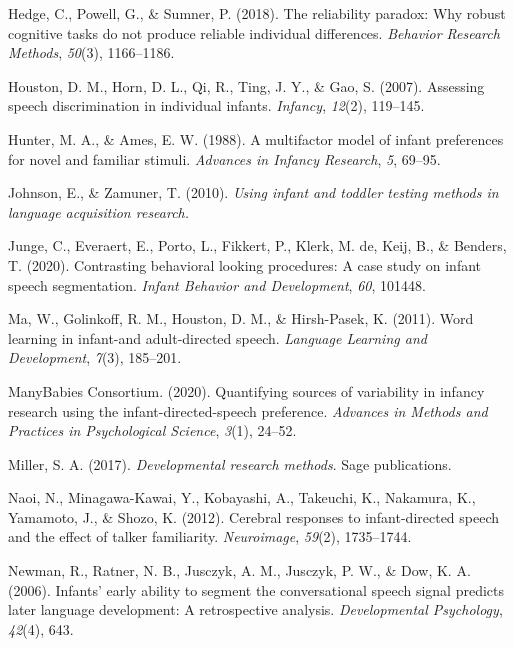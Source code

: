 \documentclass[
  man,floatsintext]{apa6}
\newlength{\cslhangindent}
\newlength{\cslentryspacingunit} %
\newenvironment{CSLReferences}[2] %
 {%
  \setlength{\parindent}{0pt}
  \ifodd #1
  \let\oldpar\par
  \def\par{\hangindent=\cslhangindent\oldpar}
  \fi
  \setlength{\parskip}{#2\cslentryspacingunit}
 }%
 {}
\begin{document}
\begin{CSLReferences}{1}{0}
\leavevmode{}%
Hedge, C., Powell, G., \& Sumner, P. (2018). The reliability paradox: Why robust cognitive tasks do not produce reliable individual differences. \emph{Behavior Research Methods}, \emph{50}(3), 1166--1186.

\leavevmode{}%
Houston, D. M., Horn, D. L., Qi, R., Ting, J. Y., \& Gao, S. (2007). Assessing speech discrimination in individual infants. \emph{Infancy}, \emph{12}(2), 119--145.

\leavevmode{}%
Hunter, M. A., \& Ames, E. W. (1988). A multifactor model of infant preferences for novel and familiar stimuli. \emph{Advances in Infancy Research}, \emph{5}, 69--95.

\leavevmode{}%
Johnson, E., \& Zamuner, T. (2010). \emph{Using infant and toddler testing methods in language acquisition research.}

\leavevmode{}%
Junge, C., Everaert, E., Porto, L., Fikkert, P., Klerk, M. de, Keij, B., \& Benders, T. (2020). Contrasting behavioral looking procedures: A case study on infant speech segmentation. \emph{Infant Behavior and Development}, \emph{60}, 101448.

\leavevmode{}%
Ma, W., Golinkoff, R. M., Houston, D. M., \& Hirsh-Pasek, K. (2011). Word learning in infant-and adult-directed speech. \emph{Language Learning and Development}, \emph{7}(3), 185--201.

\leavevmode{}%
ManyBabies Consortium. (2020). Quantifying sources of variability in infancy research using the infant-directed-speech preference. \emph{Advances in Methods and Practices in Psychological Science}, \emph{3}(1), 24--52.

\leavevmode{}%
Miller, S. A. (2017). \emph{Developmental research methods}. Sage publications.

\leavevmode{}%
Naoi, N., Minagawa-Kawai, Y., Kobayashi, A., Takeuchi, K., Nakamura, K., Yamamoto, J., \& Shozo, K. (2012). Cerebral responses to infant-directed speech and the effect of talker familiarity. \emph{Neuroimage}, \emph{59}(2), 1735--1744.

\leavevmode{}%
Newman, R., Ratner, N. B., Jusczyk, A. M., Jusczyk, P. W., \& Dow, K. A. (2006). Infants' early ability to segment the conversational speech signal predicts later language development: A retrospective analysis. \emph{Developmental Psychology}, \emph{42}(4), 643.


\end{CSLReferences}
\end{document}
